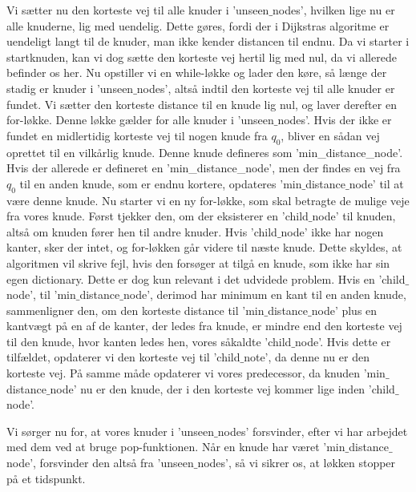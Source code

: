 Vi sætter nu den korteste vej til alle knuder i 'unseen$\_$nodes', hvilken lige nu er alle knuderne, lig med uendelig. Dette gøres, fordi der i Dijkstras algoritme er uendeligt langt til de knuder, man ikke kender distancen til endnu. Da vi starter i startknuden, kan vi dog sætte den korteste vej hertil lig med nul, da vi allerede befinder os her.
Nu opstiller vi en while-løkke og lader den køre, så længe der stadig er knuder i 'unseen$\_$nodes', altså indtil den korteste vej til alle knuder er fundet.
Vi sætter den korteste distance til en knude lig nul, og laver derefter en for-løkke. Denne løkke gælder for alle knuder i 'unseen$\_$nodes'. Hvis der ikke er fundet en midlertidig korteste vej til nogen knude fra $q_0$, bliver en sådan vej oprettet til en vilkårlig knude. Denne knude defineres som 'min\_distance\_node'. Hvis der allerede er defineret en 'min\_distance\_node', men der findes en vej fra $q_0$ til en anden knude, som er endnu kortere, opdateres 'min$\_$distance$\_$node' til at være denne knude.
Nu starter vi en ny for-løkke, som skal betragte de mulige veje fra vores knude.
Først tjekker den, om der eksisterer en 'child$\_$node' til knuden, altså om knuden fører hen til andre knuder. Hvis 'child$\_$node' ikke har nogen kanter, sker der intet, og for-løkken går videre til næste knude. Dette skyldes, at algoritmen vil skrive fejl, hvis den forsøger at tilgå en knude, som ikke har sin egen dictionary. Dette er dog kun relevant i det udvidede problem.
Hvis en 'child$\_$node', til  'min$\_$distance$\_$node', derimod har minimum en kant til en anden knude, sammenligner den, om den korteste distance til 'min$\_$distance$\_$node' plus en kantvægt på en af de kanter, der ledes fra knude, er mindre end den korteste vej til den knude, hvor kanten ledes hen, vores såkaldte 'child$\_$node'. Hvis dette er tilfældet, opdaterer vi den korteste vej til 'child$\_$note', da denne nu er den korteste vej. På samme måde opdaterer vi vores predecessor, da knuden 'min$\_$distance$\_$node' nu er den knude, der i den korteste vej kommer lige inden 'child$\_$node'.

Vi sørger nu for, at vores knuder i 'unseen$\_$nodes' forsvinder, efter vi har arbejdet med dem ved at bruge pop-funktionen. Når en knude har været 'min$\_$distance$\_$node', forsvinder den altså fra 'unseen$\_$nodes', så vi sikrer os, at løkken stopper på et tidspunkt. 

